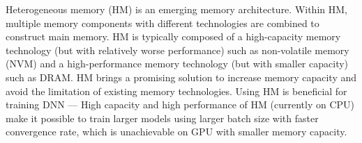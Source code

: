 
Heterogeneous memory (HM) is an emerging memory architecture.  %
Within HM, multiple memory components with different technologies are combined to construct main memory. HM is typically composed of a high-capacity memory technology (but with relatively worse performance) such as non-volatile memory (NVM) and a high-performance memory technology (but with smaller capacity) such as DRAM. HM brings a promising solution to increase memory capacity and avoid the limitation of existing memory technologies. %
Using HM is beneficial for training DNN --- 
High capacity and high performance of HM (currently on CPU) make it possible to train larger models using larger batch size with faster convergence rate, which is unachievable on GPU with smaller memory capacity.




